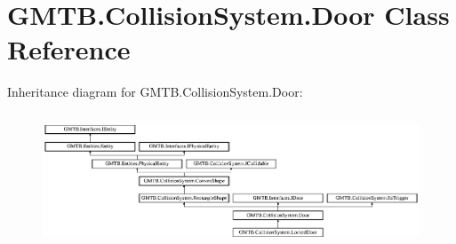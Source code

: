 \hypertarget{class_g_m_t_b_1_1_collision_system_1_1_door}{}\section{G\+M\+T\+B.\+Collision\+System.\+Door Class Reference}
\label{class_g_m_t_b_1_1_collision_system_1_1_door}
Inheritance diagram for G\+M\+T\+B.\+Collision\+System.\+Door\+:\begin{figure}[H]
\begin{center}
\leavevmode
\includegraphics[height=4.032922cm]{class_g_m_t_b_1_1_collision_system_1_1_door}
\end{center}
\end{figure}
